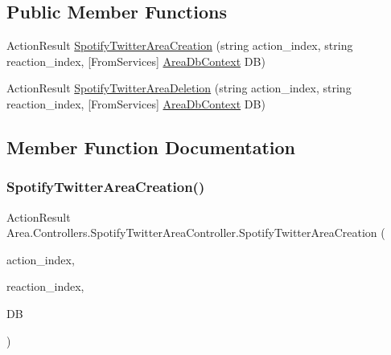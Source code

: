 \subsection*{Public Member Functions}
\begin{DoxyCompactItemize}
\item 
Action\+Result \mbox{\hyperlink{classArea_1_1Controllers_1_1SpotifyTwitterAreaController_a9338f7f5f1fca6aaa5b7e7f7c9d8d500}{Spotify\+Twitter\+Area\+Creation}} (string action\+\_\+index, string reaction\+\_\+index, \mbox{[}From\+Services\mbox{]} \mbox{\hyperlink{classArea_1_1DAT_1_1AreaDbContext}{Area\+Db\+Context}} DB)
\item 
Action\+Result \mbox{\hyperlink{classArea_1_1Controllers_1_1SpotifyTwitterAreaController_aff0e59e5467fe8a565b32fec49fee16d}{Spotify\+Twitter\+Area\+Deletion}} (string action\+\_\+index, string reaction\+\_\+index, \mbox{[}From\+Services\mbox{]} \mbox{\hyperlink{classArea_1_1DAT_1_1AreaDbContext}{Area\+Db\+Context}} DB)
\end{DoxyCompactItemize}


\subsection{Member Function Documentation}
\mbox{\label{classArea_1_1Controllers_1_1SpotifyTwitterAreaController_a9338f7f5f1fca6aaa5b7e7f7c9d8d500}} 
\subsubsection{\texorpdfstring{Spotify\+Twitter\+Area\+Creation()}{SpotifyTwitterAreaCreation()}}
{\footnotesize\ttfamily Action\+Result Area.\+Controllers.\+Spotify\+Twitter\+Area\+Controller.\+Spotify\+Twitter\+Area\+Creation (\begin{DoxyParamCaption}\item[{string}]{action\+\_\+index,  }\item[{string}]{reaction\+\_\+index,  }\item[{\mbox{[}\+From\+Services\mbox{]} \mbox{\hyperlink{classArea_1_1DAT_1_1AreaDbContext}{Area\+Db\+Context}}}]{DB }\end{DoxyParamCaption})\hspace{0.3cm}{\ttfamily [inline]}}

